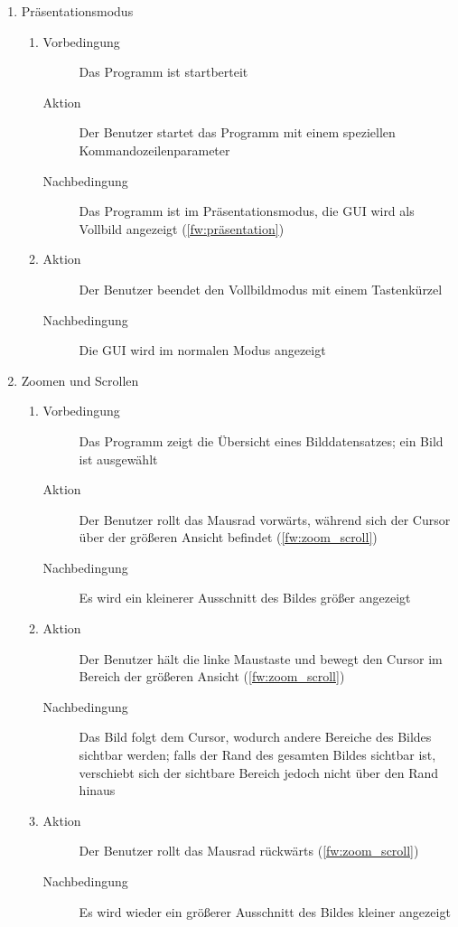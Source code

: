 \begin{enumerate} [label=\bfseries /TSW \arabic*0/, leftmargin=*]
	\item Präsentationsmodus \label{ts:präsentation}
	\begin{enumerate}[leftmargin=0pt]
		\item
		\begin{description}
			\item[Vorbedingung] Das Programm ist startberteit
			\item[Aktion] Der Benutzer startet das Programm mit einem speziellen Kommandozeilenparameter
			\item[Nachbedingung] Das Programm ist im Präsentationsmodus, die GUI wird als Vollbild angezeigt (\ref{fw:präsentation})
		\end{description}
		\item
		\begin{description}
			\item[Aktion] Der Benutzer beendet den Vollbildmodus mit einem Tastenkürzel
			\item[Nachbedingung] Die GUI wird im normalen Modus angezeigt
		\end{description}
	\end{enumerate}

	\item Zoomen und Scrollen \label{ts:zoom_scroll}
	\begin{enumerate}[leftmargin=0pt]
		\item
		\begin{description}
			\item[Vorbedingung] Das Programm zeigt die Übersicht eines Bilddatensatzes; ein Bild ist ausgewählt
			\item[Aktion] Der Benutzer rollt das Mausrad vorwärts, während sich der Cursor über der größeren Ansicht befindet (\ref{fw:zoom_scroll})
			\item[Nachbedingung] Es wird ein kleinerer Ausschnitt des Bildes größer angezeigt
		\end{description}
		\item
		\begin{description}
			\item[Aktion] Der Benutzer hält die linke Maustaste und bewegt den Cursor im Bereich der größeren Ansicht (\ref{fw:zoom_scroll})
			\item[Nachbedingung] Das Bild folgt dem Cursor, wodurch andere Bereiche des Bildes sichtbar werden; falls der Rand des gesamten Bildes sichtbar ist, verschiebt sich der sichtbare Bereich jedoch nicht über den Rand hinaus
		\end{description}
		\item
		\begin{description}
			\item[Aktion] Der Benutzer rollt das Mausrad rückwärts (\ref{fw:zoom_scroll})
			\item[Nachbedingung] Es wird wieder ein größerer Ausschnitt des Bildes kleiner angezeigt
		\end{description}
	\end{enumerate}


\end{enumerate}
